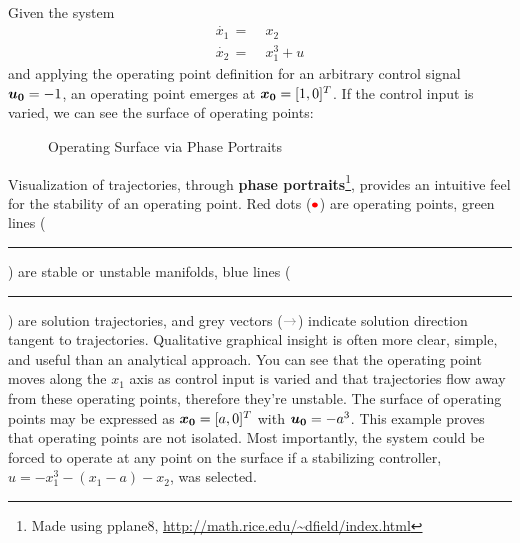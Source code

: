 \documentclass[12pt]{ucthesis}
\begin{document}
\begin{eg} ~\\ %
	Given the system 
		\begin{align*}
		\dot{x_1} \, =& \; x_2 \\
		\dot{x_2} \, =& \; x_1^3 + u
		\end{align*}
	and applying the operating point definition for an arbitrary control signal $\boldsymbol{u_0}=-1$, an operating point emerges at $\boldsymbol{x_0} = [1,0]^T$. If the control input is varied, we can see the surface of operating points:
	\begin{figure}[H]
		\centering
		\subfloat[$\vect{u_0}=-1,\quad \vect{x_0}={[1,0]}^T $]{\label{fig: op_point_1}\texttt{[image: 3\_theory/u=-1.pdf]}}
		\subfloat[$\vect{u_0}=0,\quad \vect{x_0}={[0,0]}^T$]{\label{fig: op_point_2}\texttt{[image: 3\_theory/u=0.pdf]}}
		\subfloat[$\vect{u_0}=1,\quad \vect{x_0}={[-1,0]}^T$]{\label{fig: op_point_3}\texttt{[image: 3\_theory/u=1.pdf]}}
		\caption{Operating Surface via Phase Portraits}
		\label{fig: operating_pt}
	\end{figure}
	Visualization of trajectories, through \textbf{phase portraits}\footnote{Made using pplane8, \url{http://math.rice.edu/~dfield/index.html}}, provides an intuitive feel for the stability of an operating point. Red dots (${\color{red}\bullet}$) are operating points, green lines ({\color{green}\rule[2.5pt]{1em}{1pt}}) are stable or unstable manifolds, blue lines ({\color{blue}\rule[2.5pt]{1em}{1pt}}) are solution trajectories, and grey vectors (${\color{gray}\mathbf{\rightarrow}}$) indicate solution direction tangent to trajectories. Qualitative graphical insight is often more clear, simple, and useful than an analytical approach. You can see that the operating point moves along the $x_1$ axis as control input is varied and that trajectories flow away from these operating points, therefore they're unstable. The surface of operating points may be expressed as $\boldsymbol{x_0} = [a,0]^T$ with $\boldsymbol{u_0} = -a^3$. This example proves that operating points are not isolated. Most importantly, the system could be forced to operate at any point on the surface if a stabilizing controller, $u=-x_1^3 - (x_1-a)-x_2$, was selected.
	\label{eg: operating_pt}
\end{eg}%
\end{document}

